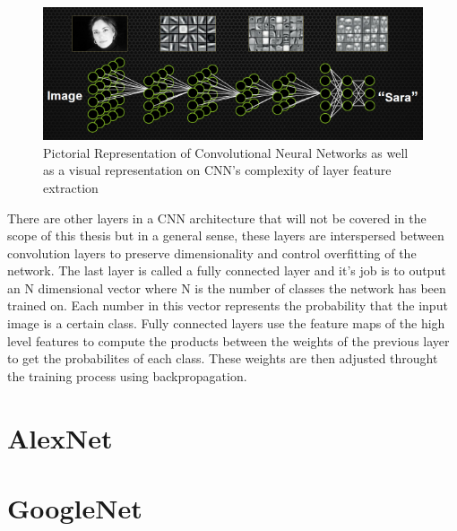 \begin{figure}[h!]
\centering
\includegraphics[width=.9\linewidth]{figs/facialDetection.png}
\caption{Pictorial Representation of Convolutional Neural Networks as well as a visual representation on CNN's complexity of layer feature extraction}
\label{fig:featuremaps}
\end{figure}
There are other layers in a CNN architecture that will not be covered in the scope of this thesis but in a general sense, these layers are interspersed between convolution layers to preserve dimensionality and control overfitting of the network. The last layer is called a fully connected layer and it's job is to output an N dimensional vector where N is the number of classes the network has been trained on. Each number in this vector represents the probability that the input image is a certain class. Fully connected layers use the feature maps of the high level features to compute the products between the weights of the previous layer to get the probabilites of each class. These weights are then adjusted throught the training process using backpropagation. 
\section{AlexNet}
\section{GoogleNet}
